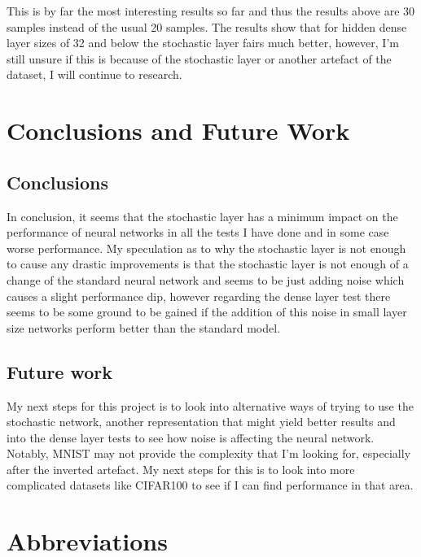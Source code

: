 \documentclass[a4paper,oneside,phd,etd]{BYUPhys}
\begin{document}
This is by far the most interesting results so far and thus the results above are 30 samples instead of the usual 20 samples. The results show that for hidden dense layer sizes of 32 and below the stochastic layer fairs much better, however, I'm still unsure if this is because of the stochastic layer or another artefact of the dataset, I will continue to research.

\chapter{Conclusions and Future Work}
\label{chap:Conclusions}

\section{Conclusions}
\label{sec:ConclusionsConclusions}
In conclusion, it seems that the stochastic layer has a minimum impact on the performance of neural networks in all the tests I have done and in some case worse performance. My speculation as to why the stochastic layer is not enough to cause any drastic improvements is that the stochastic layer is not enough of a change of the standard neural network and seems to be just adding noise which causes a slight performance dip, however regarding the dense layer test there seems to be some ground to be gained if the addition of this noise in small layer size networks perform better than the standard model.

\section{Future work}
\label{sec:ConclustionsFuturework}
My next steps for this project is to look into alternative ways of trying to use the stochastic network, another representation that might yield better results and into the dense layer tests to see how noise is affecting the neural network.
Notably, MNIST may not provide the complexity that I'm looking for, especially after the inverted artefact. My next steps for this is to look into more complicated datasets like CIFAR100 to see if I can find performance in that area.

\clearemptydoublepage
\chapter{Abbreviations}
\label{chap:abbreviations}
\end{document}
